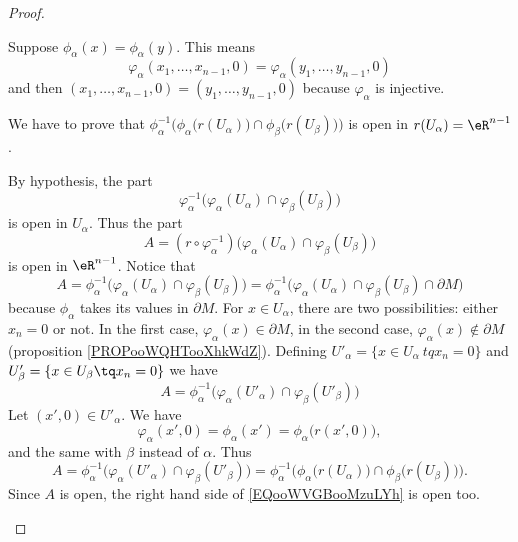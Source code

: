 \begin{proof}
\begin{subproof}
		Suppose \( \phi_{\alpha}(x)=\phi_{\alpha}(y)\). This means
		\begin{equation}
			\varphi_{\alpha}(x_1,\ldots,x_{n-1},0)=\varphi_{\alpha}(y_1,\ldots,y_{n-1},0)
		\end{equation}
		and then \( (x_1,\ldots,x_{n-1},0)=(y_1,\ldots,y_{n-1},0)\) because \( \varphi_{\alpha}\) is injective.

		We have to prove that \( \phi_{\alpha}^{-1}\Big( \phi_{\alpha}\big( r(U_{\alpha}) \big)\cap \phi_{\beta}\big( r(U_{\beta}) \big)  \Big)\) is open in \( r(U_{\alpha})=\eR^{n-1}\).

		By hypothesis, the part
		\begin{equation}
			\varphi_{\alpha}^{-1}\big( \varphi_{\alpha}(U_{\alpha})\cap \varphi_{\beta}(U_{\beta}) \big)
		\end{equation}
		is open in \( U_{\alpha}\). Thus the part
		\begin{equation}
			A=(r\circ \varphi_{\alpha}^{-1})  \big( \varphi_{\alpha}(U_{\alpha})\cap \varphi_{\beta}(U_{\beta}) \big)
		\end{equation}
		is open in \( \eR^{n-1}\). Notice that
		\begin{equation}
			A=\phi_{\alpha}^{-1}\Big( \varphi_{\alpha}(U_{\alpha})\cap \varphi_{\beta}(U_{\beta}) \Big)=\phi_{\alpha}^{-1} \Big( \varphi_{\alpha}(U_{\alpha})\cap \varphi_{\beta}(U_{\beta})\cap\partial M \Big)
		\end{equation}
		because \( \phi_{\alpha}\) takes its values in \( \partial M\). For \( x\in U_{\alpha}\), there are two possibilities: either \( x_n=0\) or not. In the first case, \( \varphi_{\alpha}(x)\in \partial M\), in the second case, \( \varphi_{\alpha}(x)\not\in \partial M\) (proposition \ref{PROPooWQHTooXhkWdZ}). Defining \( U'_{\alpha}=\{ x\in U_{\alpha}\ tq x_n=0 \}\) and \( U_{\beta}'=\{ x\in U_{\beta}\tq x_n=0 \}\) we have
		\begin{equation}
			A=\phi_{\alpha}^{-1} \Big( \varphi_{\alpha}(U'_{\alpha})\cap \varphi_{\beta}(U'_{\beta}) \Big)
		\end{equation}
		Let \( (x',0)\in U'_{\alpha}\). We have
		\begin{equation}
			\varphi_{\alpha}(x',0)=\phi_{\alpha}(x')=\phi_{\alpha}\big( r(x',0) \big),
		\end{equation}
		and the same with \( \beta\) instead of \( \alpha\). Thus
		\begin{equation}		\label{EQooWVGBooMzuLYh}
			A=\phi_{\alpha}^{-1} \Big( \varphi_{\alpha}(U'_{\alpha})\cap \varphi_{\beta}(U'_{\beta}) \Big)=\phi_{\alpha}^{-1}\Big( \phi_{\alpha}\big( r(U_{\alpha}) \big)\cap\phi_{\beta}\big( r(U_{\beta}) \big) \Big).
		\end{equation}
		Since \( A\) is open, the right hand side of \eqref{EQooWVGBooMzuLYh} is open too.


\end{subproof}
\end{proof}
